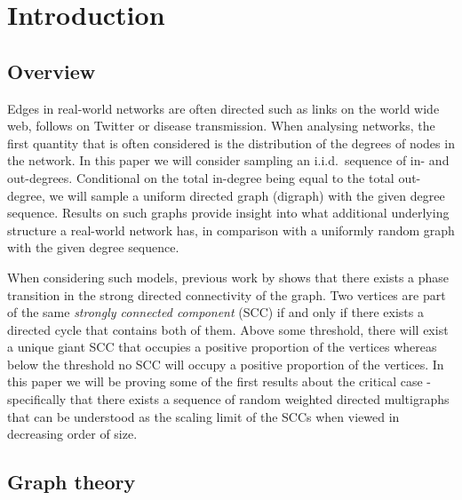 \section{Introduction}


\subsection{Overview}

Edges in real-world networks are often directed such as links on the world wide web, follows on Twitter or disease transmission. When analysing networks, the first quantity that is often considered is the distribution of the degrees of nodes in the network.  In this paper we will consider sampling an i.i.d.\ sequence of in- and out-degrees. Conditional on the total in-degree being equal to the total out-degree, we will sample a uniform directed graph (digraph) with the given degree sequence. Results on such graphs provide insight into what additional underlying structure a real-world network has, in comparison with a uniformly random graph with the given degree sequence.

When considering such models, previous work by \citet{cooperSizeLargestStrongly2004} shows that there exists a phase transition in the strong directed connectivity of the graph. Two vertices are part of the same \emph{strongly connected component} (SCC) if and only if there exists a directed cycle that contains both of them. Above some threshold, there will exist a unique giant SCC that occupies a positive proportion of the vertices whereas below the threshold no SCC will occupy a positive proportion of the vertices. In this paper we will be proving some of the first results about the critical case - specifically that there exists a sequence of random weighted directed multigraphs that can be understood as the scaling limit of the SCCs when viewed in decreasing order of size.

\subsection{Graph theory}

